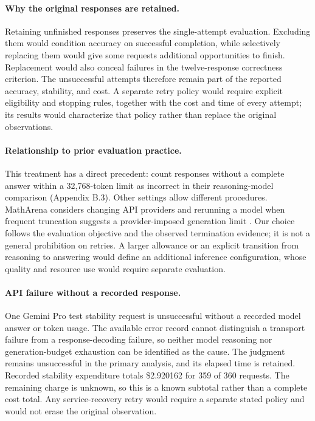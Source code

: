 \documentclass{article}
\begin{document}
\paragraph{Why the original responses are retained.}
Retaining unfinished responses preserves the single-attempt evaluation. Excluding them would condition accuracy on successful completion, while selectively replacing them would give some requests additional opportunities to finish. Replacement would also conceal failures in the twelve-response correctness criterion. The unsuccessful attempts therefore remain part of the reported accuracy, stability, and cost. A separate retry policy would require explicit eligibility and stopping rules, together with the cost and time of every attempt; its results would characterize that policy rather than replace the original observations.

\paragraph{Relationship to prior evaluation practice.}
This treatment has a direct precedent: \citet{bashari2026gespi} count responses without a complete answer within a 32,768-token limit as incorrect in their reasoning-model comparison (Appendix B.3). Other settings allow different procedures. MathArena considers changing API providers and rerunning a model when frequent truncation suggests a provider-imposed generation limit \citep[Section 3.3]{balunovic2025matharena}. Our choice follows the evaluation objective and the observed termination evidence; it is not a general prohibition on retries. A larger allowance or an explicit transition from reasoning to answering would define an additional inference configuration, whose quality and resource use would require separate evaluation.

\paragraph{API failure without a recorded response.}
One Gemini Pro test stability request is unsuccessful without a recorded model answer or token usage. The available error record cannot distinguish a transport failure from a response-decoding failure, so neither model reasoning nor generation-budget exhaustion can be identified as the cause. The judgment remains unsuccessful in the primary analysis, and its elapsed time is retained. Recorded stability expenditure totals \$2.920162 for 359 of 360 requests. The remaining charge is unknown, so this is a known subtotal rather than a complete cost total. Any service-recovery retry would require a separate stated policy and would not erase the original observation.

\end{document}
